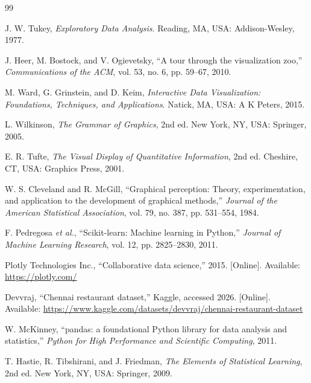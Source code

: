 \documentclass[11pt,a4paper]{article}
\begin{document}
\newpage
\begin{thebibliography}{99}

J. W. Tukey, \emph{Exploratory Data Analysis}. Reading, MA, USA: Addison-Wesley, 1977.

J. Heer, M. Bostock, and V. Ogievetsky, ``A tour through the visualization zoo,'' \emph{Communications of the ACM}, vol. 53, no. 6, pp. 59--67, 2010.

M. Ward, G. Grinstein, and D. Keim, \emph{Interactive Data Visualization: Foundations, Techniques, and Applications}. Natick, MA, USA: A K Peters, 2015.

L. Wilkinson, \emph{The Grammar of Graphics}, 2nd ed. New York, NY, USA: Springer, 2005.

E. R. Tufte, \emph{The Visual Display of Quantitative Information}, 2nd ed. Cheshire, CT, USA: Graphics Press, 2001.

W. S. Cleveland and R. McGill, ``Graphical perception: Theory, experimentation, and application to the development of graphical methods,'' \emph{Journal of the American Statistical Association}, vol. 79, no. 387, pp. 531--554, 1984.

F. Pedregosa \emph{et al.}, ``Scikit-learn: Machine learning in Python,'' \emph{Journal of Machine Learning Research}, vol. 12, pp. 2825--2830, 2011.

Plotly Technologies Inc., ``Collaborative data science,'' 2015. [Online]. Available: \url{https://plotly.com/}

Devvraj, ``Chennai restaurant dataset,'' Kaggle, accessed 2026. [Online]. Available: \url{https://www.kaggle.com/datasets/devvraj/chennai-restaurant-dataset}

W. McKinney, ``pandas: a foundational Python library for data analysis and statistics,'' \emph{Python for High Performance and Scientific Computing}, 2011.

T. Hastie, R. Tibshirani, and J. Friedman, \emph{The Elements of Statistical Learning}, 2nd ed. New York, NY, USA: Springer, 2009.

\end{thebibliography}
\end{document}
